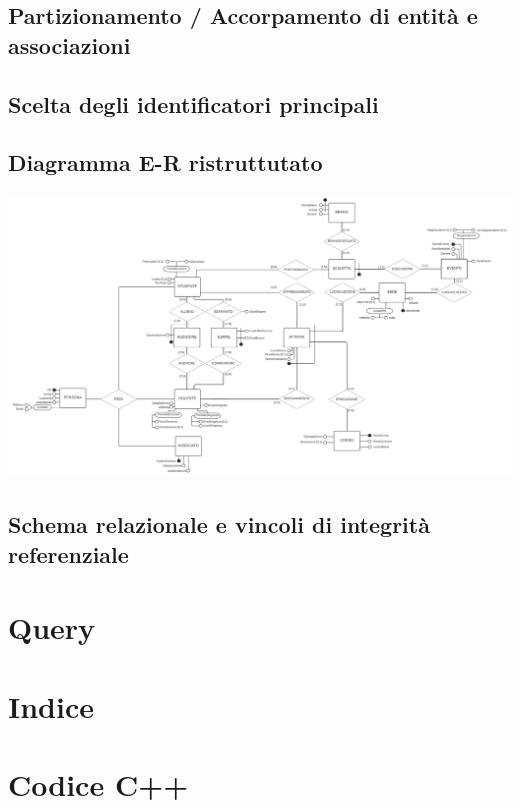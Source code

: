\documentclass[11pt]{article}
\begin{document}
	\subsection{Partizionamento / Accorpamento di entità e associazioni}
	\subsection{Scelta degli identificatori principali}
	\subsection{Diagramma E-R ristruttutato}
		\includegraphics[scale=0.55]{../SchemaConcettuale/ER-LUCIDCHART - ER-concettuale 2.jpeg}
	\subsection{Schema relazionale e vincoli di integrità referenziale}
\section{Query}
\section{Indice}
\section{Codice C++}
\end{document}
